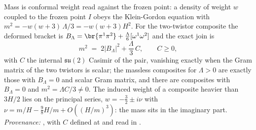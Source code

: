 Mass is conformal weight read against the frozen point: a density of weight $w$ coupled to the frozen point $I$ obeys the Klein-Gordon equation with $m^{2} = -w(w+3)\,\Lambda/3 = -w(w+3)H^{2}$. For the two-twistor composite the deformed bracket is $B_{\Lambda} = \br{\pi^{1}\pi^{2}} + \tfrac{\Lambda}{6}[\omega^{1}\omega^{2}]$ and the exact join is
\[
m^{2} \;=\; 2|B_{\Lambda}|^{2} + \frac{\Lambda}{3}\,C, \qquad C \ge 0,
\]
with $C$ the internal $\mathfrak{su}(2)$ Casimir of the pair, vanishing exactly when the Gram matrix of the two twistors is scalar; the massless composites for $\Lambda > 0$ are exactly those with $B_{\Lambda} = 0$ and scalar Gram matrix, and there are composites with $B_{\Lambda} = 0$ and $m^{2} = \Lambda C/3 \ne 0$. The induced weight of a composite heavier than $3H/2$ lies on the principal series, $w = -\tfrac32 \pm i\nu$ with $\nu = m/H - \tfrac98 H/m + O((H/m)^{3})$: the mass sits in the imaginary part. \emph{Provenance:} \cite[Thm.~3.1, Thm.~5.6, Prop.~5.9]{ButlerT11}, with $C$ defined at \cite[eq.~(9)]{ButlerT11} and read in \cite[Rem.~5.10]{ButlerT11}.
